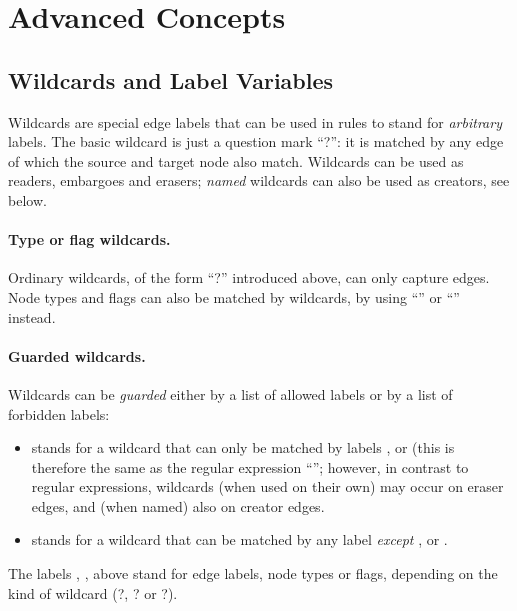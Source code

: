 \clearpage
\section{Advanced Concepts}


\subsection{Wildcards and Label Variables}

Wildcards are special edge labels that can be used in rules to stand for
\emph{arbitrary} labels. The basic wildcard is just a question mark
``\lab?'': it is matched by any edge of which the source and target node
also match. Wildcards can be used as readers, embargoes and erasers;
\emph{named} wildcards can also be used as creators, see below.

\paragraph{Type or flag wildcards.}

Ordinary wildcards, of the form ``\lab?'' introduced above, can only
capture edges. Node types and flags can also be matched by wildcards, by using
``'' or ``'' instead.

\paragraph{Guarded wildcards.}

Wildcards can be \emph{guarded} either by a list of allowed labels or by a list
of forbidden labels:
\begin{itemize}\noitemsep
\item {} stands for a wildcard that can only be matched by
  labels ,  or  (this is therefore the same as
  the regular expression ``''; however, in contrast to
  regular expressions, wildcards (when used on their own) may occur on eraser
  edges, and (when named) also on creator edges.

\item {} stands for a wildcard that can be matched by any
  label \emph{except} ,  or .
\end{itemize}
%
The labels , ,  above stand for edge labels, node types
or flags, depending on the kind of wildcard (\lab?, \typeP\lab? or
\flagP\lab?).

